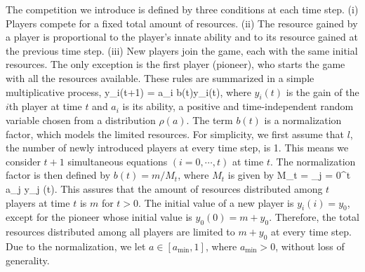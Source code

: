 \documentclass[amsmath,amssymb,floatf
ix]{revtex4}
\begin{document}
The competition we introduce is defined by three conditions at each time
step.
(i) Players compete for a fixed total amount of resources.
(ii) The resource gained by a player is proportional to the player's innate
ability and to its resource gained at the previous time step.
(iii) New players join the game, each with the same initial resources. The
only exception is the first player (pioneer), who starts the game with all
the resources available.
These rules are summarized in a simple multiplicative process,
\be\label{1}
y_i(t+1) = a_i b(t)y_i(t),
\en
where $y_i(t)$ is the gain of the $i$th player at time $t$ and $a_i$ is its
ability, a positive and time-independent random variable chosen from a
distribution $\rho(a)$.
The term $b(t)$ is a normalization factor, which models the limited resources.
For simplicity, we first assume that $l$, the number of
newly introduced players at every time step, is 1. This means we consider $t
+ 1 $ simultaneous equations $(i=0, \cdots, t)$ at time $t$.
The normalization factor is then defined by $b(t) =
m/M_t$, where  $M_t$ is given by
\be\label{2}
M_t = \sum\limits_{j = 0}^t {a_j y_j (t)}.
\en
This assures that the amount of resources distributed among $t$ players at
time
$t$ is $m $ for $t > 0$.
The initial value of a new player is $y_i(i) = y_0$, except for the pioneer
whose initial value is $y_0(0)=m + y_0$. Therefore, the total resources
distributed among all players are limited to $m + y_0 $ at every time step.
Due to the normalization, we let $a \in [a_{\min},1]$, where $a_{\min}> 0$,
without loss of generality.
\end{document}
